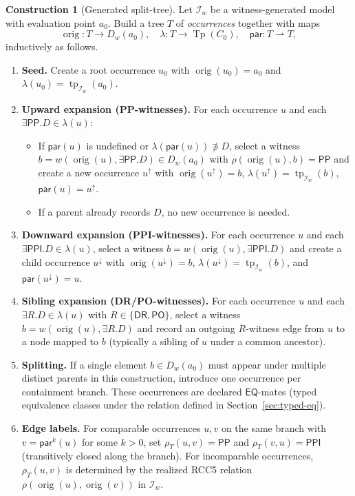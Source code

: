 \documentclass[11pt]{article}
\theoremstyle{definition}
\newtheorem{construction}[theorem]{Construction}
\theoremstyle{remark}
\newcommand{\DR}{\mathsf{DR}}
\newcommand{\PO}{\mathsf{PO}}
\newcommand{\PP}{\mathsf{PP}}
\newcommand{\PPI}{\mathsf{PPI}}
\newcommand{\EQ}{\mathsf{EQ}}
\newcommand{\Tp}{\operatorname{Tp}}
\newcommand{\tp}{\operatorname{tp}}
\newcommand{\orig}{\operatorname{orig}}
\begin{document}
\begin{construction}[Generated split-tree]\label{con:split-tree}
Let $\mathcal{I}_w$ be a witness-generated model with evaluation
point $a_0$.  Build a tree $T$ of \emph{occurrences} together with
maps
\[
\orig : T \to D_w(a_0), \quad
\lambda : T \to \Tp(C_0), \quad
\mathsf{par} : T \rightharpoonup T,
\]
inductively as follows.

\begin{enumerate}
\item \textbf{Seed.}\; Create a root occurrence $u_0$ with
$\orig(u_0) = a_0$ and $\lambda(u_0) = \tp_{\mathcal{I}_w}(a_0)$.

\item \textbf{Upward expansion (PP-witnesses).}\; For each
occurrence $u$ and each $\exists\PP.D \in \lambda(u)$:
\begin{itemize}
\item If $\mathsf{par}(u)$ is undefined or
  $\lambda(\mathsf{par}(u)) \not\ni D$, select a witness $b =
  w(\orig(u),\exists\PP.D) \in D_w(a_0)$ with $\rho(\orig(u),b) =
  \PP$ and create a new occurrence $u^\uparrow$ with
  $\orig(u^\uparrow) = b$, $\lambda(u^\uparrow) =
  \tp_{\mathcal{I}_w}(b)$, $\mathsf{par}(u) = u^\uparrow$.
\item If a parent already records $D$, no new occurrence is needed.
\end{itemize}

\item \textbf{Downward expansion (PPI-witnesses).}\; For each
occurrence $u$ and each $\exists\PPI.D \in \lambda(u)$, select a
witness $b = w(\orig(u),\exists\PPI.D)$ and create a child
occurrence $u^\downarrow$ with $\orig(u^\downarrow) = b$,
$\lambda(u^\downarrow) = \tp_{\mathcal{I}_w}(b)$, and
$\mathsf{par}(u^\downarrow) = u$.

\item \textbf{Sibling expansion (DR/PO-witnesses).}\; For each
occurrence $u$ and each $\exists R.D \in \lambda(u)$ with $R \in
\{\DR,\PO\}$, select a witness $b = w(\orig(u),\exists R.D)$ and
record an outgoing $R$-witness edge from $u$ to a node mapped to
$b$ (typically a sibling of $u$ under a common ancestor).

\item \textbf{Splitting.}\; If a single element $b \in D_w(a_0)$
must appear under multiple distinct parents in this construction,
introduce one occurrence per containment branch.  These
occurrences are declared $\EQ$-mates (typed equivalence classes
under the relation defined in Section~\ref{sec:typed-eq}).

\item \textbf{Edge labels.}\; For comparable occurrences $u, v$ on
the same branch with $v = \mathsf{par}^k(u)$ for some $k > 0$, set
$\rho_T(u,v) = \PP$ and $\rho_T(v,u) = \PPI$ (transitively closed
along the branch).  For incomparable occurrences, $\rho_T(u,v)$ is
determined by the realized RCC5 relation $\rho(\orig(u),\orig(v))$
in $\mathcal{I}_w$.
\end{enumerate}
\end{construction}
\end{document}
